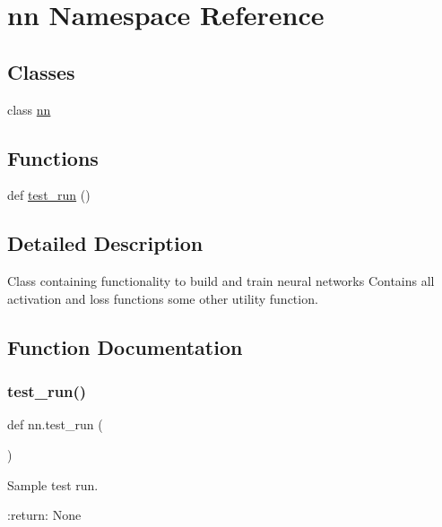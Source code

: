 \hypertarget{namespacenn}{}\section{nn Namespace Reference}
\label{namespacenn}
\subsection*{Classes}
\begin{DoxyCompactItemize}
\item 
class \hyperlink{classnn_1_1nn}{nn}
\end{DoxyCompactItemize}
\subsection*{Functions}
\begin{DoxyCompactItemize}
\item 
def \hyperlink{namespacenn_a41434a534feda89aa18e029cdbe7d8ff}{test\+\_\+run} ()
\end{DoxyCompactItemize}


\subsection{Detailed Description}
\begin{DoxyVerb}Class containing functionality to build and train neural networks
Contains all activation and loss functions some other utility function.
\end{DoxyVerb}
 

\subsection{Function Documentation}
\mbox{\label{namespacenn_a41434a534feda89aa18e029cdbe7d8ff}} 
\subsubsection{\texorpdfstring{test\+\_\+run()}{test\_run()}}
{\footnotesize\ttfamily def nn.\+test\+\_\+run (\begin{DoxyParamCaption}{ }\end{DoxyParamCaption})}

\begin{DoxyVerb}Sample test run.

:return: None
\end{DoxyVerb}
 
